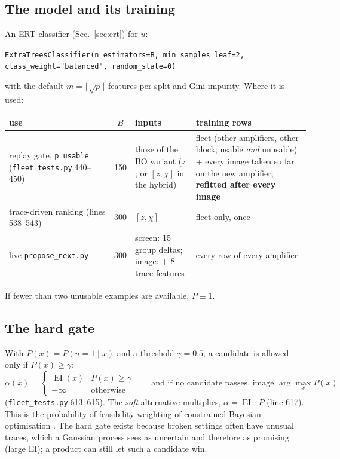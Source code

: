\documentclass[10pt,a4paper]{article}
\newcommand{\code}[1]{\texttt{\small #1}}
\newcommand{\EI}{\operatorname{EI}}
\begin{document}
\subsection{The model and its training}
An ERT classifier (Sec.~\ref{sec:ert}) for $u$:
\begin{center}\code{ExtraTreesClassifier(n\_estimators=B, min\_samples\_leaf=2, class\_weight="balanced", random\_state=0)}\end{center}
with the default $m=\lfloor\sqrt{p}\rfloor$ features per split and Gini impurity. Where it is used:
\begin{center}\small
\begin{tabularx}{\linewidth}{@{}>{\raggedright\arraybackslash}p{3.3cm}c>{\raggedright\arraybackslash}X>{\raggedright\arraybackslash}X@{}}\toprule
use & $B$ & inputs & training rows\\\midrule
replay gate, \code{p\_usable} (\code{fleet\_tests.py}:440--450) & 150 & those of the BO variant ($z$; or $[z,\chi]$ in the hybrid) & fleet (other amplifiers, other block; usable \emph{and} unusable) + every image taken so far on the new amplifier; \textbf{refitted after every image}\\
trace-driven ranking (lines 538--543) & 300 & $[z,\chi]$ & fleet only, once\\
live \code{propose\_next.py} & 300 & screen: 15 group deltas; image: + 8 trace features & every row of every amplifier\\\bottomrule
\end{tabularx}
\end{center}
If fewer than two unusable examples are available, $P\equiv1$.

\subsection{The hard gate}
With $P(x)=P(u=1\mid x)$ and a threshold $\gamma=0.5$, a candidate is allowed only if $P(x)\ge\gamma$:
\begin{equation}
\alpha(x)=\begin{cases}\EI(x) & P(x)\ge\gamma\\ -\infty & \text{otherwise}\end{cases}
\qquad\text{and if no candidate passes, image }\arg\max_xP(x)
\label{eq:gate}
\end{equation}
(\code{fleet\_tests.py}:613--615). The \emph{soft} alternative multiplies, $\alpha=\EI\cdot P$ (line 617). This is the
probability-of-feasibility weighting of constrained Bayesian optimisation \cite{schonlau1998,gardner2014,gelbart2014}.
The hard gate exists because broken settings often have unusual traces, which a Gaussian process sees as uncertain and
therefore as promising (large EI); a product can still let such a candidate win.
\end{document}
